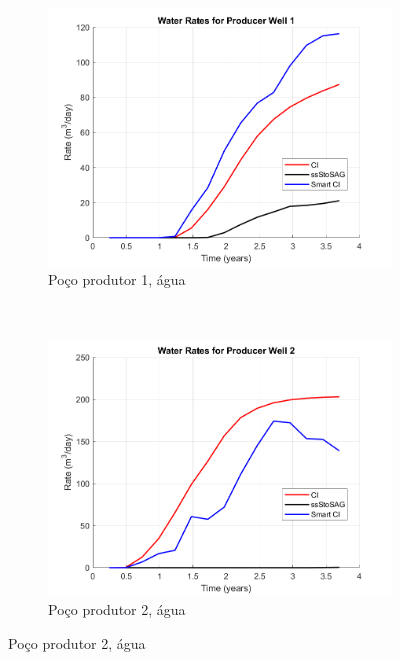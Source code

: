 \begin{figure}[!ht]
	\centering
	\begin{subfigure}[b]{.3\textwidth}
		\includegraphics[width=\textwidth]{figs/resultadosEgg/imgsim4/EGG_WaterWell1_Zoom}
		\caption{Po\c{c}o produtor 1, \'{a}gua}
		\label{EGG4_WaterWell1}
	\end{subfigure}
	~
	\begin{subfigure}[b]{.3\textwidth}
		\includegraphics[width=\textwidth]{figs/resultadosEgg/imgsim4/EGG_WaterWell2_Zoom}
		\caption{Po\c{c}o produtor 2, \'{a}gua}
		\label{EGG4_WaterWell2}
	\end{subfigure}
	

\end{figure}
